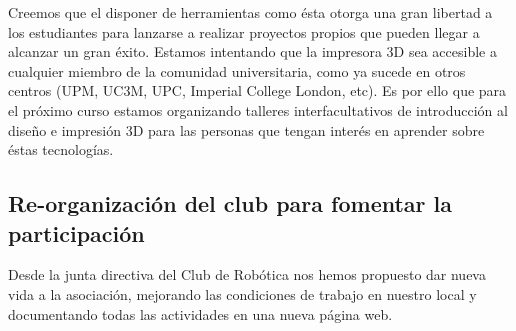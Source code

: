 \documentclass[12pt,twoside]{report}
\begin{document}
Creemos que el disponer de herramientas como ésta otorga una gran libertad a los estudiantes para lanzarse a realizar proyectos propios que pueden llegar a alcanzar un gran éxito. Estamos intentando que la impresora 3D sea accesible a cualquier miembro de la comunidad universitaria, como ya sucede en otros centros (UPM, UC3M, UPC, Imperial College London, etc). Es por ello que para el próximo curso estamos organizando talleres interfacultativos de introducción al diseño e impresión 3D para las personas que tengan interés en aprender sobre éstas tecnologías.











\subsection{Re-organización del club para fomentar la participación}

Desde la junta directiva del Club de Robótica nos hemos propuesto dar nueva vida a la asociación, mejorando las condiciones de trabajo en nuestro local y documentando todas las actividades en una nueva página web.
\end{document}
